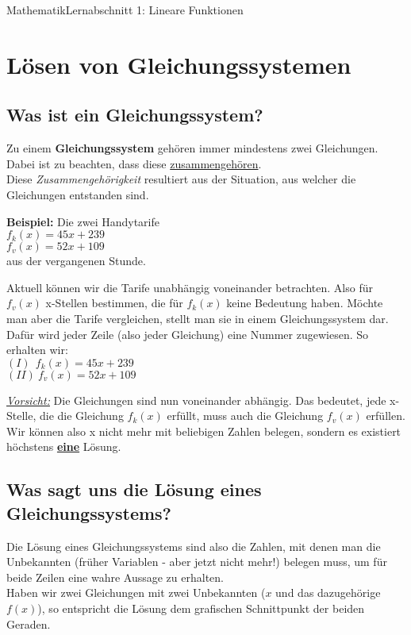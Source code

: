 \documentclass[11pt,twocolumn,oneside,openany,headings=optiontotoc,11pt,numbers=noenddot]{article}
\begin{document}
	\begin{worksheet}{}{Mathematik}{Lernabschnitt 1: Lineare Funktionen}
		\section{Lösen von Gleichungssystemen}
		\label{sec:lgs}
		\subsection{Was ist ein Gleichungssystem?}
		Zu einem \textbf{Gleichungssystem} gehören immer mindestens zwei Gleichungen. Dabei ist zu beachten, dass diese \underline{zusammengehören}.\\
		Diese \textit{Zusammengehörigkeit} resultiert aus der Situation, aus welcher die Gleichungen entstanden sind.\\
		\par\noindent
		\textbf{Beispiel:} Die zwei Handytarife\\
		\(f_k(x) = 45x + 239\)\\
		\(f_v(x) = 52x + 109\)\\
		aus der vergangenen Stunde.\\
		\par\noindent
		Aktuell können wir die Tarife unabhängig voneinander betrachten. Also für \(f_v(x)\) x-Stellen bestimmen, die für \(f_k(x)\) keine Bedeutung haben. Möchte man aber die Tarife vergleichen, stellt man sie in einem Gleichungssystem dar. Dafür wird jeder Zeile (also jeder Gleichung) eine Nummer zugewiesen. So erhalten wir:\\
		\((I)\ \ f_k(x) = 45x + 239\)\\
		\((II)\ f_v(x) = 52x + 109\)\\
		\par\noindent
		\underline{\textit{Vorsicht:}} Die Gleichungen sind nun voneinander abhängig. Das bedeutet, jede x-Stelle, die die Gleichung \(f_k(x)\) erfüllt, muss auch die Gleichung \(f_v(x)\) erfüllen.\\
		Wir können also x nicht mehr mit beliebigen Zahlen belegen, sondern es existiert höchstens \underline{\textbf{eine}} Lösung.
		\subsection{Was sagt uns die Lösung eines Gleichungssystems?}
		Die Lösung eines Gleichungssystems sind also die Zahlen, mit denen man die Unbekannten (früher Variablen - aber jetzt nicht mehr!) belegen muss, um für beide Zeilen eine wahre Aussage zu erhalten.\\
		Haben wir zwei Gleichungen mit zwei Unbekannten (\(x\) und das dazugehörige \(f(x)\)), so entspricht die Lösung dem grafischen Schnittpunkt der beiden Geraden.\\

\end{worksheet}
\end{document}
